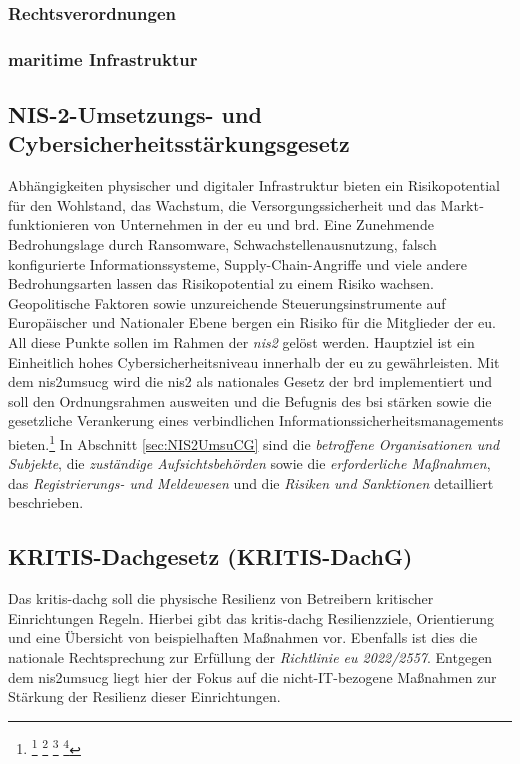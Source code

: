 \documentclass[11pt,a4paper,hidelinks]{article}   %
\begin{document}
            \subsubsection{Rechtsverordnungen}

            \subsubsection{maritime Infrastruktur }

            \subsection{NIS-2-Umsetzungs- und Cybersicherheitsstärkungsgesetz}\label{subsec:NIS2UmsuCG}
            Abhängigkeiten physischer und digitaler Infrastruktur bieten ein Risikopotential für den Wohlstand, das Wachstum, die Versorgungssicherheit und das Markt­funktionieren von Unternehmen in der \gls{eu} und \gls{brd}. Eine Zunehmende Bedrohungslage durch Ransomware, Schwachstellen­ausnutzung, falsch konfigurierte Informationssysteme, Supply-Chain-Angriffe und viele andere Bedrohungsarten lassen das Risikopotential zu einem Risiko wachsen. Geopolitische Faktoren sowie unzureichende Steuerungs­instrumente auf Europäischer und Nationaler Ebene bergen ein Risiko für die Mitglieder der \gls{eu}. All diese Punkte sollen im Rahmen der \emph{\gls{nis2}} gelöst werden. Hauptziel ist ein Einheitlich hohes Cyber­sicherheits­niveau innerhalb der \gls{eu} zu gewährleisten. Mit dem \gls{nis2umsucg} wird die \gls{nis2} als nationales Gesetz der \gls{brd} implementiert und soll den Ordnungs­rahmen ausweiten und die Befugnis des \gls{bsi} stärken sowie die gesetzliche Verankerung eines verbindlichen Informations­sicherheits­managements bieten.\footnote{
                \footcite[Vgl. S 1 - 2][]{NIS2UmsuCG}
                \footcite[Vgl. Absatz 1, 3, 5][]{EU2022-2555}
                \footcite[Vgl. S. 14 - 15][]{bsi:074457}
                \footcite[S. 9, 12 - 13 \& 37][]{enisa:7a4796}
            } In Abschnitt \ref{sec:NIS2UmsuCG} sind die \emph{betroffene Organisationen und Subjekte}, die \emph{zuständige Aufsichtsbehörden} sowie die \emph{erforderliche Maßnahmen}, das \emph{Registrierungs- und Meldewesen} und die \emph{Risiken und Sanktionen} detailliert beschrieben.

            \subsection{KRITIS-Dachgesetz (KRITIS-DachG)}
                Das \gls{kritis-dachg} soll die physische Resilienz von Betreibern kritischer Einrichtungen Regeln. Hierbei gibt das \gls{kritis-dachg} Resilienzziele, Orientierung und eine Übersicht von beispielhaften Maßnahmen vor. Ebenfalls ist dies die nationale Rechtsprechung zur Erfüllung der \emph{Richtlinie \gls{eu} 2022/2557}. Entgegen dem \gls{nis2umsucg} liegt hier der Fokus auf die nicht-IT-bezogene Maßnahmen zur Stärkung der Resilienz dieser Einrichtungen.
\end{document}
